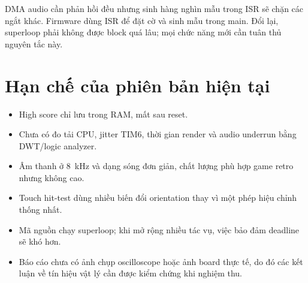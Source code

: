 DMA audio cần phản hồi đều nhưng sinh hàng nghìn mẫu trong ISR sẽ chặn các ngắt khác. Firmware dùng ISR để đặt cờ và sinh mẫu trong main. Đổi lại, superloop phải không được block quá lâu; mọi chức năng mới cần tuân thủ nguyên tắc này.

\section{Hạn chế của phiên bản hiện tại}

\begin{itemize}
  \item High score chỉ lưu trong RAM, mất sau reset.
  \item Chưa có đo tải CPU, jitter TIM6, thời gian render và audio underrun bằng DWT/logic analyzer.
  \item Âm thanh ở \SI{8}{\kilo\hertz} và dạng sóng đơn giản, chất lượng phù hợp game retro nhưng không cao.
  \item Touch hit-test dùng nhiều biến đổi orientation thay vì một phép hiệu chỉnh thống nhất.
  \item Mã nguồn chạy superloop; khi mở rộng nhiều tác vụ, việc bảo đảm deadline sẽ khó hơn.
  \item Báo cáo chưa có ảnh chụp oscilloscope hoặc ảnh board thực tế, do đó các kết luận về tín hiệu vật lý cần được kiểm chứng khi nghiệm thu.
\end{itemize}
